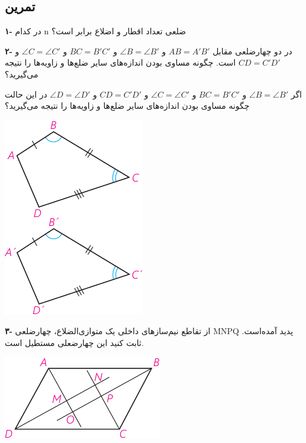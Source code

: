 \documentclass[12pt, a4paper, twoside]{book}
\begin{document}
\subsection{تمرین}
	\begin{multicols}{2}
			\textbf{۱-} در کدام n ضلعی تعداد اقطار و اضلاع برابر است؟
			\bigskip
			
				\textbf{۲- }در دو چهارضلعی مقابل 
			$ AB = A'B' $
			و
			$ \angle B = \angle B' $
			و
			$ BC = B'C' $
			و
			$ \angle C = \angle C' $
			و
			$ CD = C'D' $
			است. چگونه مساوی بودن اندازه‌های سایر ضلع‌ها و زاویه‌ها را نتیجه می‌گیرید؟
			
			اگر 
			$ \angle B = \angle B' $
			و
			$ BC = B'C' $
			و
			$ \angle C = \angle C' $
			و
			$ CD = C'D' $
			و
			$ \angle D = \angle D' $
			در این حالت چگونه مساوی بودن اندازه‌های سایر ضلع‌ها و زاویه‌ها را نتیجه می‌گیرید؟

\begin{center}
					\includegraphics{"Shapes/Fasl - 3/Dars 1/PDFs/P63-S3,4.pdf"}
\end{center}

\bigskip
				\textbf{۳-} از تقاطع نیم‌سازهای داخلی یک متوازی‌الضلاع، چهارضلعی
			MNPQ
			پدید آمده‌است. ثابت کنید این چهارضعلی مستطیل است.
			
\begin{center}
				\includegraphics{"Shapes/Fasl - 3/Dars 1/PDFs/P63-S5.pdf"}
\end{center}


\end{multicols}
\end{document}
